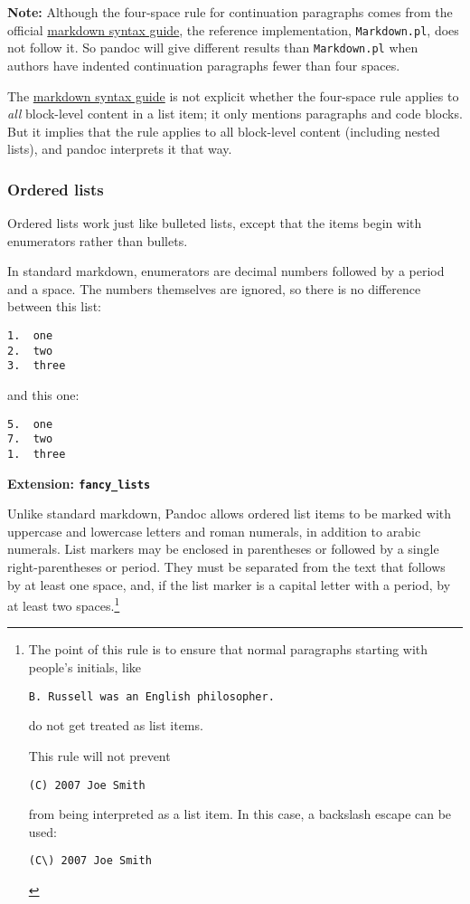 \documentclass[]{article}
\begin{document}
\textbf{Note:} Although the four-space rule for continuation paragraphs
comes from the official
\href{http://daringfireball.net/projects/markdown/syntax\#list}{markdown
syntax guide}, the reference implementation, \texttt{Markdown.pl}, does
not follow it. So pandoc will give different results than
\texttt{Markdown.pl} when authors have indented continuation paragraphs
fewer than four spaces.

The
\href{http://daringfireball.net/projects/markdown/syntax\#list}{markdown
syntax guide} is not explicit whether the four-space rule applies to
\emph{all} block-level content in a list item; it only mentions
paragraphs and code blocks. But it implies that the rule applies to all
block-level content (including nested lists), and pandoc interprets it
that way.

\subsubsection{Ordered lists}\label{ordered-lists}

Ordered lists work just like bulleted lists, except that the items begin
with enumerators rather than bullets.

In standard markdown, enumerators are decimal numbers followed by a
period and a space. The numbers themselves are ignored, so there is no
difference between this list:

\begin{verbatim}
1.  one
2.  two
3.  three
\end{verbatim}

and this one:

\begin{verbatim}
5.  one
7.  two
1.  three
\end{verbatim}

\textbf{Extension: \texttt{fancy\_lists}}

Unlike standard markdown, Pandoc allows ordered list items to be marked
with uppercase and lowercase letters and roman numerals, in addition to
arabic numerals. List markers may be enclosed in parentheses or followed
by a single right-parentheses or period. They must be separated from the
text that follows by at least one space, and, if the list marker is a
capital letter with a period, by at least two spaces.\footnote{The point
  of this rule is to ensure that normal paragraphs starting with
  people's initials, like

\begin{Verbatim}
B. Russell was an English philosopher.
\end{Verbatim}

  do not get treated as list items.

  This rule will not prevent

\begin{Verbatim}
(C) 2007 Joe Smith
\end{Verbatim}

  from being interpreted as a list item. In this case, a backslash
  escape can be used:

\begin{Verbatim}
(C\) 2007 Joe Smith
\end{Verbatim}
}
\end{document}
